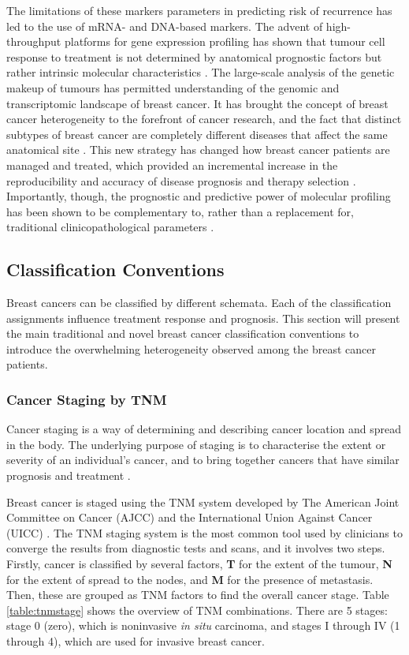     The limitations of these markers parameters in predicting risk of recurrence has led to the use of mRNA- and DNA-based markers. The advent of high-throughput platforms for gene expression profiling has shown that tumour cell response to treatment is not determined by anatomical prognostic factors but rather intrinsic molecular characteristics \cite{Iwamoto2010PredictingData}. The large-scale analysis of the genetic makeup of tumours has permitted understanding of the genomic and transcriptomic landscape of breast cancer. It has brought the concept of breast cancer heterogeneity to the forefront of cancer research, and the fact that distinct subtypes of breast cancer are completely different diseases that affect the same anatomical site \cite{weigelt2010}. This new strategy has changed how breast cancer patients are managed and treated, which provided an incremental increase in the reproducibility and accuracy of disease prognosis and therapy selection \cite{pusztai2008}. Importantly, though, the prognostic and predictive power of molecular profiling has been shown to be complementary to, rather than a replacement for, traditional clinicopathological parameters \cite{weigelt2010}.

   
    \subsection{Classification Conventions}
    
    Breast cancers can be classified by different schemata. Each of the classification assignments influence treatment response and prognosis.  This section will present the main traditional and novel breast cancer classification conventions to introduce the overwhelming heterogeneity observed among the breast cancer patients. 


    \subsubsection{Cancer Staging by TNM}
    
    Cancer staging is a way of determining and describing cancer location and spread in the body. The underlying purpose of staging is to characterise the extent or severity of an individual’s cancer, and to bring together cancers that have similar prognosis and treatment \cite{2017AJCCStaging}. 

    Breast cancer is staged using the TNM system developed by The American Joint Committee on Cancer (AJCC) and the International Union Against Cancer (UICC) \cite{Giuliano2017}. The TNM staging system is the most common tool used by clinicians to converge the results from diagnostic tests and scans, and it involves two steps. Firstly, cancer is classified by several factors, \textbf{T} for the extent of the tumour, \textbf{N} for the extent of spread to the nodes, and \textbf{M} for the presence of metastasis. Then, these are grouped as TNM factors to find the overall cancer stage. Table \ref{table:tnmstage} shows the overview of TNM combinations. There are 5 stages: stage 0 (zero), which is noninvasive \textit{in situ} carcinoma, and stages I through IV (1 through 4), which are used for invasive breast cancer.


